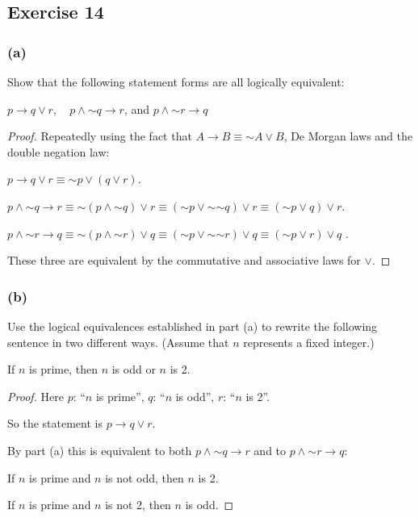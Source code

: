\documentclass[14pt]{extarticle}
\begin{document}
\subsection{Exercise 14}
\subsubsection{(a)}
Show that the following statement forms are all logically equivalent:

$p \to q \vee r$, \,\,\, $p \wedge {\sim q} \to r$, and $p \wedge {\sim r} \to
q$

\begin{proof}
Repeatedly using the fact that $A \to B \equiv {\sim A} \vee B$, De Morgan laws
and the double negation law:

$p \to q \vee r \equiv {\sim p} \vee (q \vee r)$.

$p \wedge {\sim q} \to r \equiv {\sim (p \wedge {\sim q}) \vee r} \equiv ({\sim
p} \vee {\sim {\sim q}}) \vee r \equiv ({\sim p} \vee q) \vee r$.

$p \wedge {\sim r} \to q \equiv {\sim (p \wedge {\sim r}) \vee q} \equiv ({\sim
p} \vee {\sim {\sim r}}) \vee q \equiv ({\sim p} \vee r) \vee q$ .

These three are equivalent by the commutative and associative laws for $\vee$.
\end{proof}

\subsubsection{(b)}
Use the logical equivalences established in part (a) to rewrite the following
sentence in two different ways. (Assume that $n$ represents a fixed integer.)

\begin{center}
If $n$ is prime, then $n$ is odd or $n$ is 2.
\end{center}

\begin{proof}
Here $p$: ``$n$ is prime'', $q$: ``$n$ is odd'', $r$: ``$n$ is 2''.

So the statement is $p \to q \vee r$.

By part (a) this is equivalent to both $p \wedge {\sim q} \to r$ and to $p
\wedge {\sim r} \to q$:

If $n$ is prime and $n$ is not odd, then $n$ is 2.

If $n$ is prime and $n$ is not 2, then $n$ is odd.
\end{proof}
\end{document}
